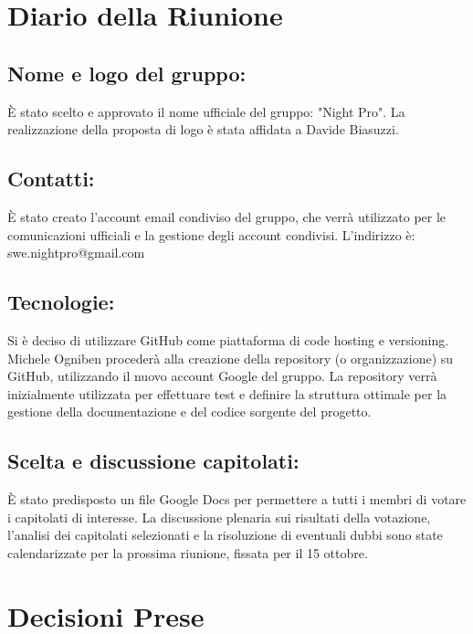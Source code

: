 \documentclass[a4paper, 11pt, oneside]{scrartcl} %
\begin{document}
\newpage
\section{Diario della Riunione}

\subsection{Nome e logo del gruppo:}
È stato scelto e approvato il nome ufficiale del gruppo: "Night Pro". La realizzazione della proposta di logo è stata affidata a Davide Biasuzzi.

\subsection{Contatti:}
È stato creato l'account email condiviso del gruppo, che verrà utilizzato per le comunicazioni ufficiali e la gestione degli account condivisi. L'indirizzo è: swe.nightpro@gmail.com
\subsection{Tecnologie:}
Si è deciso di utilizzare GitHub come piattaforma di code hosting e versioning. Michele Ogniben procederà alla creazione della repository (o organizzazione) su GitHub, utilizzando il nuovo account Google del gruppo. La repository verrà inizialmente utilizzata per effettuare test e definire la struttura ottimale per la gestione della documentazione e del codice sorgente del progetto.
\subsection{Scelta e discussione capitolati:}
È stato predisposto un file Google Docs per permettere a tutti i membri di votare i capitolati di interesse. La discussione plenaria sui risultati della votazione, l'analisi dei capitolati selezionati e la risoluzione di eventuali dubbi sono state calendarizzate per la prossima riunione, fissata per il 15 ottobre.
\newpage
\section{Decisioni Prese}
\end{document}
